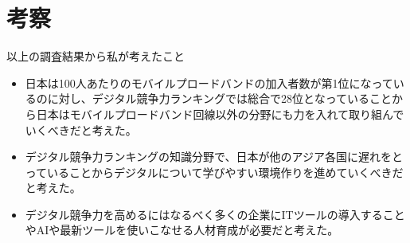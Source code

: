 \documentclass[a4paper,11pt,dvipdfmx]{ujarticle}
\begin{document}
\section{考察}

以上の調査結果から私が考えたこと
\begin{itemize}
    \item 日本は100人あたりのモバイルプロードバンドの加入者数が第1位になっているのに対し、デジタル競争力ランキングでは総合で28位となっていることから日本はモバイルプロードバンド回線以外の分野にも力を入れて取り組んでいくべきだと考えた。
    \item デジタル競争力ランキングの知識分野で、日本が他のアジア各国に遅れをとっていることからデジタルについて学びやすい環境作りを進めていくべきだと考えた。
    \item デジタル競争力を高めるにはなるべく多くの企業にITツールの導入することやAIや最新ツールを使いこなせる人材育成が必要だと考えた。
\end{itemize}



\end{document}
